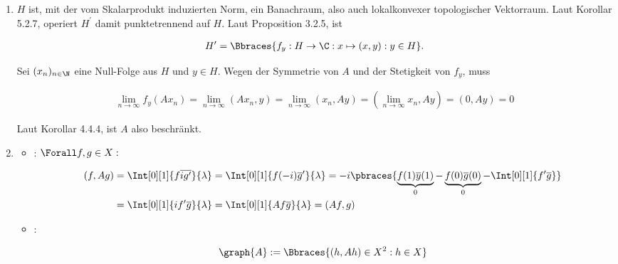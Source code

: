 \begin{solution}

\phantom{}

\begin{enumerate}

  \item
  $H$ ist, mit der vom Skalarprodukt induzierten Norm, ein Banachraum, also auch lokalkonvexer topologischer Vektorraum.
  Laut Korollar 5.2.7, operiert $H^\prime$ damit punktetrennend auf $H$.
  Laut Proposition 3.2.5, ist

  \begin{align*}
    H^\prime
    =
    \Bbraces
    {
      f_y:
      H \to \C:
      x \mapsto (x, y):
      y \in H
    }.
  \end{align*}

  Sei $(x_n)_{n \in \N}$ eine Null-Folge aus $H$ und $y \in H$.
  Wegen der Symmetrie von $A$ und der Stetigkeit von $f_y$, muss

  \begin{align*}
    \lim_{n \to \infty} f_y(A x_n)
    =
    \lim_{n \to \infty} (A x_n, y)
    =
    \lim_{n \to \infty} (x_n, A y)
    =
    (\lim_{n \to \infty} x_n, A y)
    =
    (0, A y) = 0
  \end{align*}

  Laut Korollar 4.4.4, ist $A$ also beschränkt.


  \item
  \begin{itemize}

    \item
    :
    $\Forall f, g \in X:$

    \begin{align*}
      (f, A g)
      & =
      \Int[0][1]{f \overline{i g^\prime}}{\lambda}
      =
      \Int[0][1]{f (-i) \overline{g}^\prime}{\lambda}
      =
      -i \pbraces
      {
        \underbrace{f(1) \overline{y}(1)}_0 -
        \underbrace{f(0) \overline{g}(0)}_0 -
        \Int[0][1]{f^\prime \overline{g}}
      } \\
      & =
      \Int[0][1]{i f^\prime \overline{g}}{\lambda}
      =
      \Int[0][1]{A f \overline{g}}{\lambda}
      =
      (A f, g)
    \end{align*}

    \item
    :

    \begin{align*}
      \graph{A} :=
      \Bbraces
      {
        (h, A h) \in X^2:
        h \in X
      }
    \end{align*}


\end{itemize}
\end{enumerate}
\end{solution}
